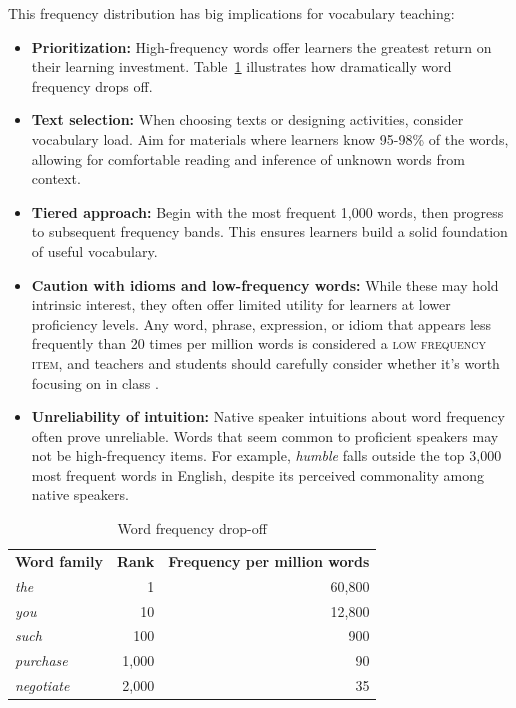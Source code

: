 This frequency distribution has big implications for vocabulary teaching:

\begin{itemize}
    \item \textbf{Prioritization:} High-frequency words offer learners the greatest return on their learning investment. Table~\ref{tab:word-frequency} illustrates how dramatically word frequency drops off.
    
    \item \textbf{Text selection:} When choosing texts or designing activities, consider vocabulary load. Aim for materials where learners know 95-98\% of the words, allowing for comfortable reading and inference of unknown words from context.
    
    \item \textbf{Tiered approach:} Begin with the most frequent 1,000 words, then progress to subsequent frequency bands. This ensures learners build a solid foundation of useful vocabulary.
    
    \item \textbf{Caution with idioms and low-frequency words:} While these may hold intrinsic interest, they often offer limited utility for learners at lower proficiency levels. Any word, phrase, expression, or idiom that appears less frequently than 20 times per million words is considered a \textsc{low frequency item}, and teachers and students should carefully consider whether it's worth focusing on in class \citep{Nation2022}.
    
    \item \textbf{Unreliability of intuition:} Native speaker intuitions about word frequency often prove unreliable. Words that seem common to proficient speakers may not be high-frequency items. For example, \textit{humble} falls outside the top 3,000 most frequent words in English, despite its perceived commonality among native speakers.
\end{itemize}

\begin{table}[ht]
\centering
\caption{Word frequency drop-off}
\label{tab:word-frequency}
\begin{tabular}{lrr}
\textbf{Word family} & \textbf{Rank} & \textbf{Frequency per million words} \\
\textit{the} & 1 & 60,800 \\
\textit{you} & 10 & 12,800 \\
\textit{such} & 100 & 900 \\
\textit{purchase} & 1,000 & 90 \\
\textit{negotiate} & 2,000 & 35 \\
\end{tabular}
\end{table}

